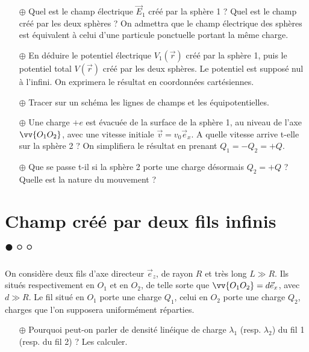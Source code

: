 \documentclass{report}
\begin{document}
\begin{itemize}

	\item[$\oplus$] Quel est le champ électrique $\vec{E}_1$ créé par la sphère 1 ? Quel est le champ créé par les deux sphères ? On admettra que le champ électrique des sphères est équivalent à celui d'une particule ponctuelle portant la même charge.
	
	\item[$\oplus$] En déduire le potentiel électrique $V_1(\vec{r})$ créé par la sphère 1, puis le potentiel total $V(\vec{r})$ créé par les deux sphères. Le potentiel est supposé nul à l'infini. On exprimera le résultat en coordonnées cartésiennes.
	
	\item[$\oplus$] Tracer sur un schéma les lignes de champs et les équipotentielles. 
	
	\item[$\oplus$] Une charge $+e$ est évacuée de la surface de la sphère 1, au niveau de l'axe $\vv{O_1O_2}$, avec une vitesse initiale $\vec{v}=v_0\vec{e}_x$. A quelle vitesse arrive t-elle sur la sphère 2 ? On simplifiera le résultat en prenant $Q_1=-Q_2=+Q$.
	
	\item[$\oplus$] Que se passe t-il si la sphère 2 porte une charge désormais $Q_2=+Q$ ? Quelle est la nature du mouvement ?

\end{itemize}

\newpage

\section*{Champ créé par deux fils infinis $\bullet\circ\circ$}

On considère deux fils d'axe directeur $\vec{e}_z$, de rayon $R$ et très long $L\gg R$. Ils situés respectivement en $O_1$ et en $O_2$, de telle sorte que $\vv{O_1O_2}=d\vec{e}_x$, avec $d\gg R$. Le fil situé en $O_1$ porte une charge $Q_1$, celui en $O_2$ porte une charge $Q_2$, charges que l'on supposera uniformément réparties. 

\begin{itemize}

	\item[$\oplus$] Pourquoi peut-on parler de densité linéique de charge $\lambda_1$ (resp. $\lambda_2$) du fil 1 (resp. du fil 2) ? Les calculer.

\end{itemize}
\end{document}
